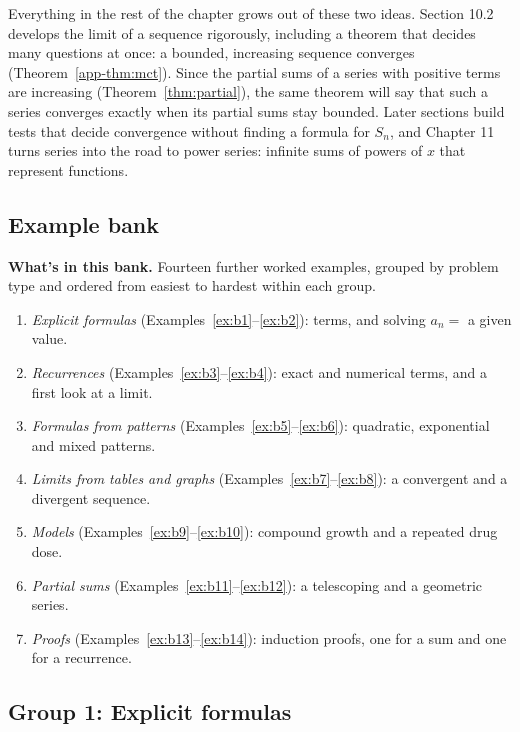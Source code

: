 \documentclass[11pt]{article}
\begin{document}
Everything in the rest of the chapter grows out of these two ideas. Section 10.2 develops the limit of a sequence rigorously, including a theorem that decides many questions at once: a bounded, increasing sequence converges (Theorem~\ref{app-thm:mct}). Since the partial sums of a series with positive terms are increasing (Theorem~\ref{thm:partial}), the same theorem will say that such a series converges exactly when its partial sums stay bounded. Later sections build tests that decide convergence without finding a formula for $S_n$, and Chapter 11 turns series into the road to power series: infinite sums of powers of $x$ that represent functions.

\subsection*{Example bank}

\textbf{What's in this bank.} Fourteen further worked examples, grouped by problem type and ordered from easiest to hardest within each group.
\begin{enumerate}[nosep]
  \item \emph{Explicit formulas} (Examples~\ref{ex:b1}--\ref{ex:b2}): terms, and solving $a_n=$ a given value.
  \item \emph{Recurrences} (Examples~\ref{ex:b3}--\ref{ex:b4}): exact and numerical terms, and a first look at a limit.
  \item \emph{Formulas from patterns} (Examples~\ref{ex:b5}--\ref{ex:b6}): quadratic, exponential and mixed patterns.
  \item \emph{Limits from tables and graphs} (Examples~\ref{ex:b7}--\ref{ex:b8}): a convergent and a divergent sequence.
  \item \emph{Models} (Examples~\ref{ex:b9}--\ref{ex:b10}): compound growth and a repeated drug dose.
  \item \emph{Partial sums} (Examples~\ref{ex:b11}--\ref{ex:b12}): a telescoping and a geometric series.
  \item \emph{Proofs} (Examples~\ref{ex:b13}--\ref{ex:b14}): induction proofs, one for a sum and one for a recurrence.
\end{enumerate}

\subsection*{Group 1: Explicit formulas}
\end{document}
